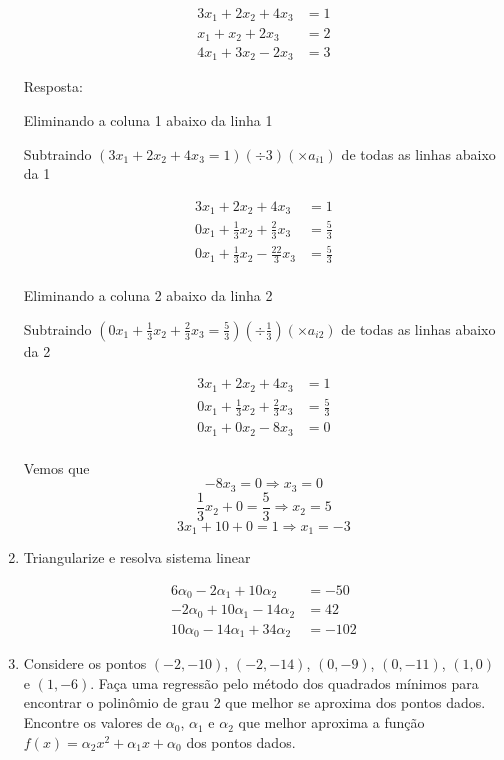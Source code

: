 \documentclass[12pt]{article}
\begin{document}
\begin{enumerate}
\begin{align*} 
  3 x_1 + 2 x_2 + 4 x_3  &= 1  \\ 
    x_1 +   x_2 + 2 x_3  &= 2  \\ 
  4 x_1 + 3 x_2 - 2 x_3  &= 3
\end{align*}

Resposta: 

Eliminando a coluna 1 abaixo da linha 1

Subtraindo 
$(3 x_1 + 2 x_2 + 4 x_3 = 1)(\div 3)(\times a_{i1})$  de todas as linhas abaixo da 1

\begin{align*} 
  3 x_1 +           2 x_2 +            4 x_3  &=          1  \\ 
  0 x_1 + \frac{1}{3} x_2 + \frac{ 2}{3} x_3  &= \frac{5}{3}  \\ 
  0 x_1 + \frac{1}{3} x_2 - \frac{22}{3} x_3  &= \frac{5}{3}  \\ 
\end{align*}

Eliminando a coluna 2 abaixo da linha 2

Subtraindo 
$(0 x_1 + \frac{1}{3} x_2 + \frac{ 2}{3} x_3 = \frac{5}{3})(\div \frac{1}{3})(\times a_{i2})$  de todas as linhas abaixo da 2

\begin{align*} 
  3 x_1 +           2 x_2 +            4 x_3  &=          1  \\ 
  0 x_1 + \frac{1}{3} x_2 + \frac{ 2}{3} x_3  &= \frac{5}{3} \\ 
  0 x_1 +           0 x_2 -            8 x_3  &=          0  \\ 
\end{align*}

Vemos que 
\[-8x_3 = 0 \Rightarrow x_3 = 0\]
\[\frac{1}{3}x_2 + 0 = \frac{5}{3} \Rightarrow x_2 = 5\]
\[3x_1 + 10 + 0 = 1 \Rightarrow x_1 = - 3\]


\item Triangularize e resolva sistema linear

\begin{align*} 
  6 \alpha_0 -  2 \alpha_1 + 10 \alpha_2  &=  -50    \\ 
 -2 \alpha_0 + 10 \alpha_1 - 14 \alpha_2  &=   42   \\ 
 10 \alpha_0 - 14 \alpha_1 + 34 \alpha_2  &= -102 
\end{align*}

\break

\item Considere os pontos $(-2, -10)$, $(-2, -14)$, $(0, -9)$, $( 0, -11)$, $(1, 0)$ e $(1, -6)$. 
Faça uma regressão pelo método dos quadrados mínimos para encontrar o polinômio de grau 2 que melhor se aproxima dos pontos dados.
Encontre os valores de $\alpha_0$, $\alpha_1$ e $\alpha_2$ que melhor aproxima a função 
$f(x) = \alpha_2x^2 + \alpha_1x + \alpha_0$ dos pontos dados.


\end{enumerate}
\end{document}
